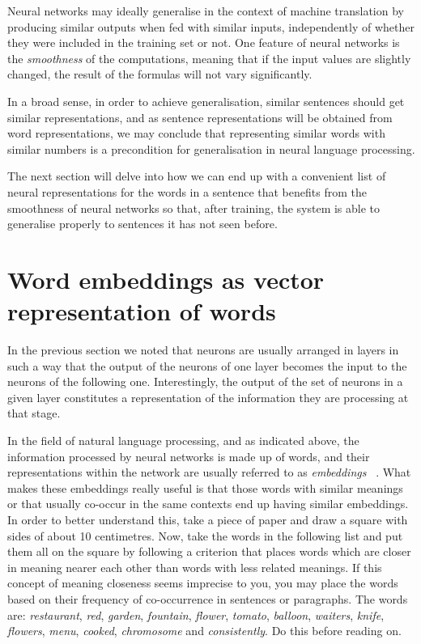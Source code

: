 \documentclass[output=paper,colorlinks,citecolor=brown]{langscibook}
\begin{document}
Neural networks may ideally generalise in the context of machine translation by producing similar outputs when fed with similar inputs, independently of whether they were included in the training set or not. One feature of neural networks is the \emph{smoothness} of the computations, meaning that if the input values are slightly changed, the result of the formulas will not vary significantly.

In a broad sense, in order to achieve generalisation, similar sentences should get similar representations, and as sentence representations will be obtained from word representations, we may conclude that representing similar words with 
similar numbers is a precondition for generalisation in neural language processing. 

The next section will delve into how we can end up with a convenient list of neural representations for the words in a sentence that benefits from the smoothness of neural networks so that, after training, the system is able to generalise properly to sentences it has not seen before.


\section{Word embeddings as vector representation of words}
\label{se:embed}

In the previous section we noted that neurons are usually arranged in layers in such a way that the output of the neurons of one layer becomes the input to the neurons of the following one. Interestingly, the output of the set of neurons in a given layer constitutes a representation of the information they are processing at that stage.


In the field of natural language processing, and as indicated above, the information processed by neural networks is made up of words, and their representations within the network are usually referred to as \emph{embeddings}~ \citep{Mikolov2013}. What makes these embeddings really useful is that those words with similar meanings or that usually co-occur in the same contexts end up having similar embeddings. In order to better understand this, take a piece of paper and draw a square with sides of about 10 centimetres. Now, take the words in the following list and put them all on the square by following a criterion that places words which are closer in meaning nearer each other than words with less related meanings. If this concept of meaning closeness seems imprecise to you, you may place the words based on their frequency of co-occurrence in sentences or paragraphs. The words are: \emph{restaurant}, \emph{red}, \emph{garden}, \emph{fountain}, \emph{flower}, \emph{tomato}, \emph{balloon}, \emph{waiters}, \emph{knife}, \emph{flowers}, \emph{menu}, \emph{cooked}, \emph{chromosome} and \emph{consistently}. Do this before reading on.
\end{document}
